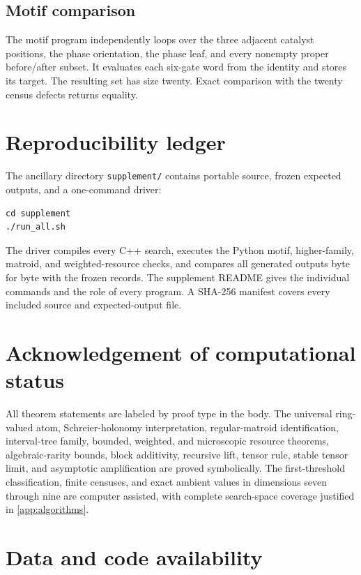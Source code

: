 \documentclass[11pt]{amsart}
\numberwithin{equation}{section}
\theoremstyle{definition}
\theoremstyle{remark}
\begin{document}
\subsection{Motif comparison}

The motif program independently loops over the three adjacent catalyst positions, the phase orientation, the phase leaf, and every nonempty proper before/after subset.  It evaluates each six-gate word from the identity and stores its target.  The resulting set has size twenty.  Exact comparison with the twenty census defects returns equality.

\section{Reproducibility ledger}\label{app:reproducibility}

The ancillary directory \texttt{supplement/} contains portable source, frozen expected outputs, and a one-command driver:
\begin{verbatim}
cd supplement
./run_all.sh
\end{verbatim}
The driver compiles every C++ search, executes the Python motif, higher-family, matroid, and weighted-resource checks, and compares all generated outputs byte for byte with the frozen records.  The supplement README gives the individual commands and the role of every program.  A SHA-256 manifest covers every included source and expected-output file.

\section*{Acknowledgement of computational status}

All theorem statements are labeled by proof type in the body.  The universal ring-valued atom, Schreier-holonomy interpretation, regular-matroid identification, interval-tree family, bounded, weighted, and microscopic resource theorems, algebraic-rarity bounds, block additivity, recursive lift, tensor rule, stable tensor limit, and asymptotic amplification are proved symbolically.  The first-threshold classification, finite censuses, and exact ambient values in dimensions seven through nine are computer assisted, with complete search-space coverage justified in \cref{app:algorithms}.

\section*{Data and code availability}
\end{document}
